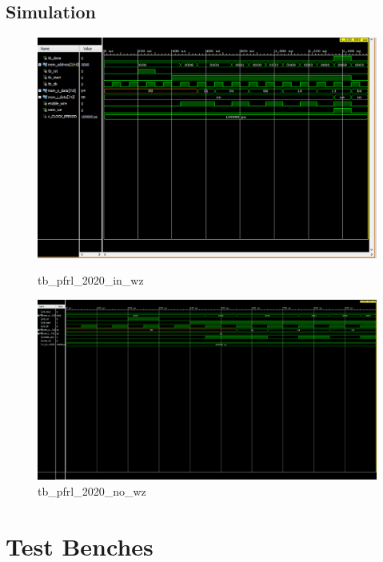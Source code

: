 \documentclass[12pt]{article}
\begin{document}
\subsection{Simulation}
\vspace{-0.2 cm}
\begin{figure}[!htb]
    \begin{center}
        \includegraphics[scale=0.45]{in_wz.png}
        \caption{tb\_pfrl\_2020\_in\_wz}
        \vspace{0.2 cm}
        \includegraphics[scale=0.45]{no_wz.png}
        \caption{tb\_pfrl\_2020\_no\_wz}
    \end{center}
\end{figure}
\begin{landscape}
    
\end{landscape}
\section{Test Benches}
\end{document}
